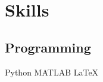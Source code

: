 \documentclass[a4paper]{deedy-resume} %
\begin{document}
\begin{minipage}[t]{0.33\textwidth}





%
%
%
%
%
%
%


\section{Skills}

\subsection{Programming}

Python \textbullet{} MATLAB \textbullet{} \LaTeX \\


\end{minipage}
\end{document}
